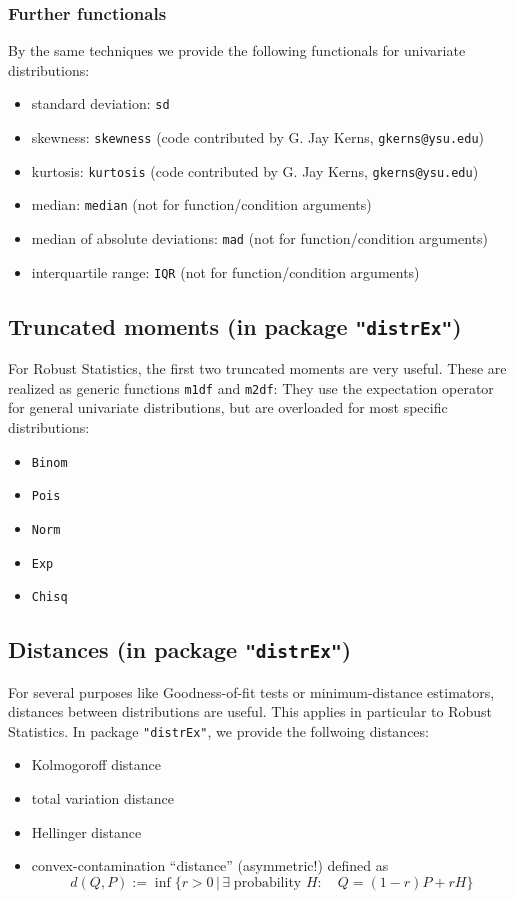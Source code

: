 \documentclass[11pt]{article}
\newcommand{\code}[1]{{\tt #1}}
\newcommand{\pkg}[1]{{\tt "#1"}}
\begin{document}
\subsubsection{Further functionals}
By the same techniques we provide the following functionals for univariate 
distributions:
\begin{itemize}
  \item standard deviation: \code{sd}
  \item skewness: \code{skewness}  
  (code contributed by G. Jay Kerns, {\small \tt gkerns@ysu.edu})
  \item kurtosis: \code{kurtosis} 
   (code contributed by G. Jay Kerns, {\small \tt gkerns@ysu.edu})
  \item median: \code{median} (not for function/condition arguments)
  \item median of absolute deviations: \code{mad} (not for function/condition 
  arguments)
  \item interquartile range: \code{IQR} (not for function/condition arguments)
\end{itemize}
%
\subsection[Truncated moments (in package distrEx)]{Truncated moments 
(in package \pkg{distrEx})}\label{m1df}
%
For Robust Statistics, the first two truncated moments are very useful. These 
are realized as generic functions \code{m1df} and \code{m2df}: They use the 
expectation operator for general univariate distributions, but are overloaded 
for most specific distributions:
\begin{itemize}
  \item \code{Binom}
  \item \code{Pois}
  \item \code{Norm}
  \item \code{Exp}
  \item \code{Chisq}
\end{itemize}
%
\subsection[Distances (in package distrEx)]{Distances (in package %
 \pkg{distrEx})}\label{Distances}
%
For several purposes like Goodness-of-fit tests or minimum-distance estimators, 
distances between distributions are useful. This applies in particular to Robust 
Statistics. In package \pkg{distrEx}, we provide the follwoing distances:
\begin{itemize}
  \item Kolmogoroff distance
  \item total variation distance
  \item Hellinger distance
  \item convex-contamination ``distance'' (asymmetric!) defined as
  $$
d(Q,P):=\inf\{r>0\,|\, \exists \;\mbox{probability } H:\quad Q=(1-r)P+rH \}
  $$
\end{itemize}
\end{document}
